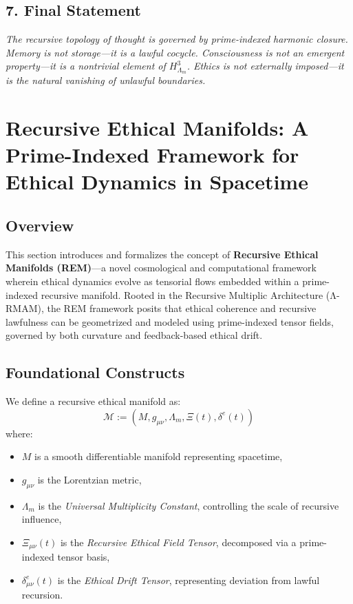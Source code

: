 \documentclass{article}
\theoremstyle{plain}
\begin{document}
\subsection{7. Final Statement}
\textit{The recursive topology of thought is governed by prime-indexed harmonic closure. Memory is not storage—it is a lawful cocycle. Consciousness is not an emergent property—it is a nontrivial element of $H^3_{\Lambda_m}$. Ethics is not externally imposed—it is the natural vanishing of unlawful boundaries.}

\section{Recursive Ethical Manifolds: A Prime-Indexed Framework for Ethical Dynamics in Spacetime}

\subsection{Overview}

This section introduces and formalizes the concept of \textbf{Recursive Ethical Manifolds (REM)}---a novel cosmological and computational framework wherein ethical dynamics evolve as tensorial flows embedded within a prime-indexed recursive manifold. Rooted in the Recursive Multiplic Architecture (Λ-RMAM), the REM framework posits that ethical coherence and recursive lawfulness can be geometrized and modeled using prime-indexed tensor fields, governed by both curvature and feedback-based ethical drift.

\subsection{Foundational Constructs}

We define a recursive ethical manifold as:
\[
\mathcal{M} := (M, g_{\mu\nu}, \Lambda_m, \Xi(t), \delta^e(t))
\]
where:
\begin{itemize}
  \item $M$ is a smooth differentiable manifold representing spacetime,
  \item $g_{\mu\nu}$ is the Lorentzian metric,
  \item $\Lambda_m$ is the \textit{Universal Multiplicity Constant}, controlling the scale of recursive influence,
  \item $\Xi_{\mu\nu}(t)$ is the \textit{Recursive Ethical Field Tensor}, decomposed via a prime-indexed tensor basis,
  \item $\delta^e_{\mu\nu}(t)$ is the \textit{Ethical Drift Tensor}, representing deviation from lawful recursion.
\end{itemize}
\end{document}
